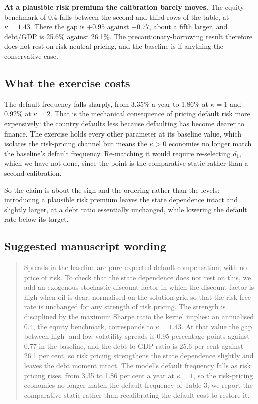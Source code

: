 \textbf{At a plausible risk premium the calibration barely moves.} The equity
benchmark of 0.4 falls between the second and third rows of the table, at
$\kappa = 1.43$. There the gap is $+0.95$ against $+0.77$, about a fifth
larger, and debt/GDP is 25.6\% against 26.1\%. The precautionary-borrowing
result therefore does not rest on risk-neutral pricing, and the baseline is if
anything the conservative case.

\subsection*{What the exercise costs}

The default frequency falls sharply, from 3.35\% a year to 1.86\% at
$\kappa = 1$ and 0.92\% at $\kappa = 2$. That is the mechanical consequence of
pricing default risk more expensively: the country defaults less because
defaulting has become dearer to finance. The exercise holds every other
parameter at its baseline value, which isolates the risk-pricing channel but
means the $\kappa > 0$ economies no longer match the baseline's default
frequency. Re-matching it would require re-selecting $d_{1}$, which we have not
done, since the point is the comparative static rather than a second
calibration.

So the claim is about the sign and the ordering rather than the levels:
introducing a plausible risk premium leaves the state dependence intact and
slightly larger, at a debt ratio essentially unchanged, while lowering the
default rate below its target.

\subsection*{Suggested manuscript wording}

\begin{quote}
Spreads in the baseline are pure expected-default compensation, with no price of
risk. To check that the state dependence does not rest on this, we add an
exogenous stochastic discount factor in which the discount factor is high when
oil is dear, normalised on the solution grid so that the risk-free rate is
unchanged for any strength of risk pricing. The strength is disciplined by the
maximum Sharpe ratio the kernel implies: an annualised 0.4, the equity
benchmark, corresponds to $\kappa = 1.43$. At that value the gap between
high- and low-volatility spreads is 0.95 percentage points against 0.77 in the
baseline, and the debt-to-GDP ratio is 25.6 per cent against 26.1 per cent, so
risk pricing strengthens the state dependence slightly and leaves the debt
moment intact. The model's default frequency falls as risk pricing rises, from
3.35 to 1.86 per cent a year at $\kappa = 1$, so the risk-pricing economies no
longer match the default frequency of Table 3; we report the comparative static
rather than recalibrating the default cost to restore it.
\end{quote}
